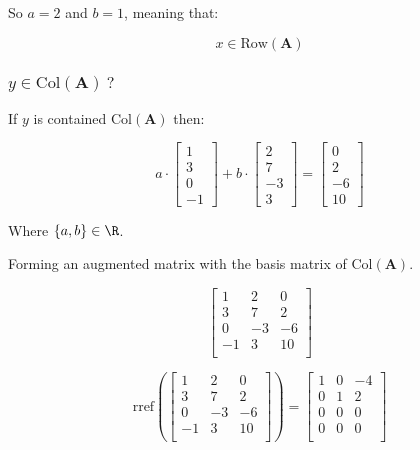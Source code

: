 \documentclass{article}
\begin{document}
So $a=2$ and $b=1$, meaning that:

\[%
    x \in \text{Row}(\mathbf{A})
\]%


\vspace{2mm}

\subsubsection{$ y \in \text{Col}(\mathbf{A}) \ ?$}
If $y$ is contained $\text{Col}(\mathbf{A})$ then:

\[%
    a \cdot 
    \begin{bmatrix} 1\\3\\0\\-1 \end{bmatrix}
    +
    b \cdot 
    \begin{bmatrix} 2\\7\\-3\\3 \end{bmatrix}
    =
    \begin{bmatrix} 0\\2\\-6\\10 \end{bmatrix} 
\]%

Where $\left\{ a,b \right\}\in \R$.

Forming an augmented matrix with the basis matrix of $\text{Col}(\mathbf{A})$.

\[%
    \begin{bmatrix} 
        1 & 2 & 0 \\
		3 & 7 & 2 \\
		0 & -3 & -6 \\
		-1 & 3 & 10 \\		
    \end{bmatrix}
\]%

\[%
    \text{rref} \left(
    \begin{bmatrix} 
        1 & 2 & 0 \\
		3 & 7 & 2 \\
		0 & -3 & -6 \\
		-1 & 3 & 10 \\		
    \end{bmatrix}
    \right) 
    =
    \begin{bmatrix} 
        1 & 0 & -4 \\
		0 & 1 & 2 \\
		0 & 0 & 0 \\
		0 & 0 & 0 \\		
    \end{bmatrix}
\]%
\end{document}
